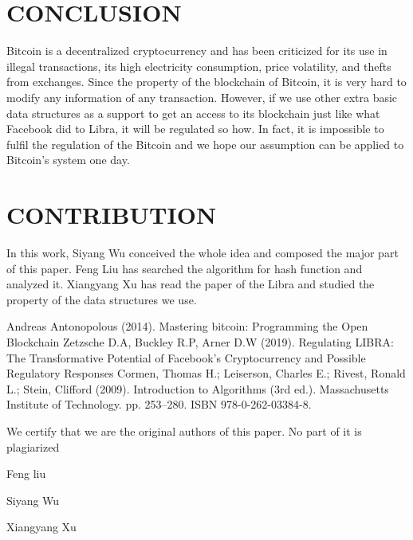 \documentclass[conference]{IEEEtran}
\begin{document}
\section{CONCLUSION}
Bitcoin is a decentralized cryptocurrency and has been criticized for its use in illegal transactions, its high electricity consumption, price volatility, and thefts from exchanges. Since the property of the blockchain of Bitcoin, it is very hard to modify any information of any transaction. However, if we use other extra basic data structures as a support to get an access to its blockchain just like what Facebook did to Libra, it will be regulated so how. In fact, it is impossible to fulfil the regulation of the Bitcoin and we hope our assumption can be applied to Bitcoin’s system one day.

\section{CONTRIBUTION}
In this work, Siyang Wu conceived the whole idea and composed the major part of this paper. Feng Liu has searched the algorithm for hash function and analyzed it. Xiangyang Xu has read the paper of the Libra and studied the property of the data structures we use.  

\begin{thebibliography}{00}
 Andreas Antonopolous (2014). Mastering bitcoin: Programming the Open Blockchain
 Zetzsche D.A, Buckley R.P, Arner D.W (2019). Regulating LIBRA: The Transformative Potential of Facebook’s Cryptocurrency and Possible Regulatory Responses
 Cormen, Thomas H.; Leiserson, Charles E.; Rivest, Ronald L.; Stein, Clifford (2009). Introduction to Algorithms (3rd ed.). Massachusetts Institute of Technology. pp. 253–280. ISBN 978-0-262-03384-8.
\end{thebibliography}

We certify that we are the original authors of this paper. No part of it is plagiarized

Feng liu

Siyang Wu

Xiangyang Xu
\end{document}
